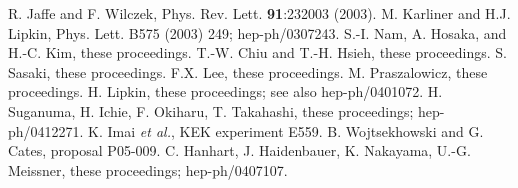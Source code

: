 \documentclass{ws-procs9x6}
\begin{document}
\begin{thebibliography}{0}
%
 R. Jaffe and F. Wilczek, Phys. Rev. Lett. {\bf 91}:232003 (2003).
 M. Karliner and H.J. Lipkin, Phys. Lett. B575 (2003) 249;
         hep-ph/0307243.
 S.-I. Nam, A. Hosaka, and H.-C. Kim, these proceedings.
%
 T.-W. Chiu and T.-H. Hsieh, these proceedings.
 S. Sasaki, these proceedings.
 F.X. Lee, these proceedings.
%
 M. Praszalowicz, these proceedings.
 H. Lipkin, these proceedings; see also hep-ph/0401072.
 H. Suganuma, H. Ichie, F. Okiharu, T. Takahashi, 
	these proceedings; hep-ph/0412271.
%
 K. Imai {\it et al.}, KEK experiment E559.
 B. Wojtsekhowski and G. Cates, proposal P05-009.
 C. Hanhart, J. Haidenbauer, K. Nakayama, U.-G. Meissner, 
	these proceedings; hep-ph/0407107.
%
\end{thebibliography}
\end{document}

